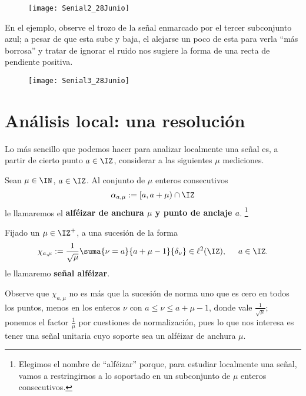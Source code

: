 \begin{figure}[H]
	\centering
	\texttt{[image: Senial2\_28Junio]}
\end{figure}

\noindent En el ejemplo, observe el trozo de la señal
enmarcado por el tercer subconjunto azul;
a pesar de que esta
sube y baja, el alejarse un poco de esta para verla
``más borrosa'' y tratar de ignorar el ruido 
nos sugiere la forma de una recta de pendiente positiva. 
\begin{figure}[H]
	\centering
	\texttt{[image: Senial3\_28Junio]}
\end{figure}


\section{Análisis local: una resolución}
Lo más sencillo que podemos hacer para analizar
localmente una señal es, a partir
de cierto punto $a \in \IZ$,
considerar a las siguientes
$\mu$ mediciones.


\begin{comment}
1.- Local, un alféizar, una resolución

a: punto de anclaje
\mu: anchura
Señal alféizar: \chi_{a, \mu}
alféizar
ventana
espacio de ventanas V_{a, \mu}
\end{comment}

\begin{defi}
Sean $\mu \in \IN$, $a \in \IZ$. 
Al conjunto de $\mu$ enteros consecutivos
\[
\alpha_{a, \mu}:= [a , a+\mu ) \cap \IZ 
\]
le llamaremos el \textbf{alféizar de anchura $\mu $
y punto de anclaje $a$}.
\footnote{Elegimos el nombre de ``alféizar'' porque, 
para estudiar localmente
una señal, vamos a restringirnos a lo soportado en 
un subconjunto de $\mu$ enteros consecutivos.} \\
\end{defi}

\begin{defi}
Fijado un $\mu \in \IZ^{+}$, a una sucesión de la forma
\[
\chi_{a, \mu}:=\frac{1}{\sqrt{\mu}} \suma{\nu=a}{a+\mu -1}{\delta_{\nu}} \in 
\ell^{2}(\IZ), 
\hspace{0.5cm} a \in \IZ.
\]
le llamaremo \textbf{señal alféizar}.
\end{defi}
Observe que $\chi_{a, \mu}$ no es más que la sucesión de norma uno que es cero
en todos los puntos, menos en
los enteros $\nu$ con $a \leq \nu \leq a + \mu -1$,
donde vale $\frac{1}{\sqrt{\mu}}$; ponemos el factor
$\frac{1}{\mu}$ por cuestiones de normalización, pues lo que
nos interesa es tener una señal unitaria cuyo soporte sea un alféizar
de anchura $\mu$.

